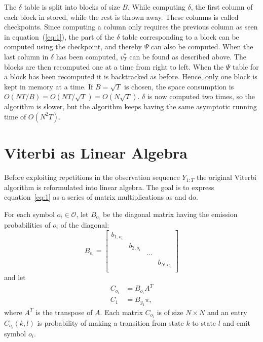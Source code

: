 The $\delta$ table is split into blocks of size $B$. While computing $\delta$,
the first column of each block in stored, while the rest is thrown away. These
columns is called checkpoints. Since computing a column only requires the
previous column as seen in equation~(\ref{eq:1}), the part of the
$\delta$ table corresponding to a block can be computed using the checkpoint,
and thereby $\Psi$ can also be computed. When the last column in $\delta$ has
been computed, $v_T^*$ can be found as described above. The blocks are then
recomputed one at a time from right to left. When the $\Psi$ table for a block
has been recomputed it is backtracked as before. Hence, only one block is kept
in memory at a time. If $B = \sqrt{T}$ is chosen, the space consumption is
$O(N T / B) = O(N T / \sqrt{T}) = O(N \sqrt{T})$. $\delta$ is now computed two times, so
the algorithm is slower, but the algorithm keeps having the same
asymptotic running time of $O(N^2 T)$.

\section{Viterbi as Linear Algebra}
\label{sec:algorithm-as-linear}

Before exploiting repetitions in the observation sequence $Y_{1:T}$ the
original Viterbi algorithm is reformulated into linear algebra. The goal is to
express equation~\eqref{eq:1} as a series of matrix multiplications as
\citet{sand2013ziphmmlib} and \citet{lifshits2009speeding} do.

For each symbol $o_i \in \mathcal{O}$, let $B_{o_i}$ be the diagonal matrix
having the emission probabilities of $o_i$ of the diagonal:
\begin{equation*}
  B_{o_i} =
  \begin{bmatrix}
    b_{1, o_i} &            &        &            \\
               & b_{2, o_i} &        &            \\
               &            & \cdots &            \\
               &            &        & b_{N, o_i} \\
  \end{bmatrix}
\end{equation*}
and let
\begin{align*}
  C_{o_i}      & = B_{o_i} A^T                    \\
  C_1          & = B_{y_1} \pi,
\end{align*}
where $A^T$ is the transpose of $A$. Each matrix $C_{o_i}$ is of size $N \times
N$ and an entry $C_{o_i}(k, l)$ is probability of making a transition
from state $k$ to state $l$ and emit symbol $o_i$.

